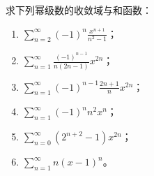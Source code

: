 \begin{xexercise}[6]
求下列幂级数的收敛域与和函数：
  \begin{enumerate}[label=(\arabic*)]
    \item $\displaystyle\sum_{n=2}^{\infty}(-1)^n\frac{x^{n+1}}{n^2-1}$；
    \item $\displaystyle\sum_{n=1}^{\infty}\frac{(-1)^{n-1}}{n(2n-1)}x^{2n}$；
    \item $\displaystyle\sum_{n=1}^{\infty}(-1)^{n-1}\frac{2n+1}{n}x^{2n}$；
    \item $\displaystyle\sum_{n=1}^{\infty}(-1)^nn^2x^n$；
    \item $\displaystyle\sum_{n=0}^{\infty}(2^{n+2}-1)x^{2n}$；
    \item $\displaystyle\sum_{n=1}^{\infty}n(x-1)^n$。
  \end{enumerate}
\end{xexercise}
